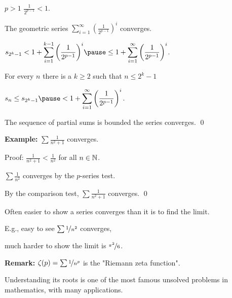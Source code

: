 \documentclass[10pt,aspectratio=149]{beamer}
\begin{document}
\begin{frame}
$p > 1$ \wthus $\frac{1}{2^{p-1}} < 1$.

\pause
\medskip

The geometric series
\quad
$\displaystyle
\sum_{i=1}^\infty
{\left(
\frac{1}{2^{p-1}}
\right)}^i$ \quad converges.

\pause
\medskip

\thus\quad
$\displaystyle
s_{2^k-1} < 
1+
\sum_{i=1}^{k-1}
{\left(
\frac{1}{2^{p-1}}
\right)}^i 
\pause
\leq 
1+
\sum_{i=1}^\infty
{\left(
\frac{1}{2^{p-1}}
\right)}^i$.

\pause
\medskip

For every $n$ there is a $k \geq 2$ such that $n \leq 2^k-1$

\pause
\medskip

\thus\qquad
$\displaystyle
s_n \leq s_{2^k-1}
\pause
< 
1+
\sum_{i=1}^\infty
{\left(
\frac{1}{2^{p-1}}
\right)}^i$.

\pause
\medskip

The sequence of partial sums is bounded
\pause
\wthus the series converges.
\qed

\end{frame}

\begin{frame}

\textbf{Example:}
$\sum \frac{1}{n^2+1}$ converges.

\pause
\medskip

Proof:  $\frac{1}{n^2+1} < \frac{1}{n^2}$ for all $n \in {\mathbb{N}}$.

\pause
\medskip

$\sum \frac{1}{n^2}$ converges by the $p$-series test.

\pause
\medskip

By the comparison test, $\sum \frac{1}{n^2+1}$ converges.
\qed

\pause
\medskip

Often easier to show a series converges than it is to find the limit.

\pause
E.g., easy to see
$\sum \nicefrac{1}{n^2}$ converges,

\pause
much harder to show the limit is $\nicefrac{\pi^2}{6}$.

\pause
\medskip

\textbf{Remark:}
$\zeta(p) = \sum \nicefrac{1}{n^p}$ is the "Riemann zeta function".

\pause
Understanding its roots is one of the most famous unsolved problems in
mathematics, with many applications.
\end{frame}
\end{document}
